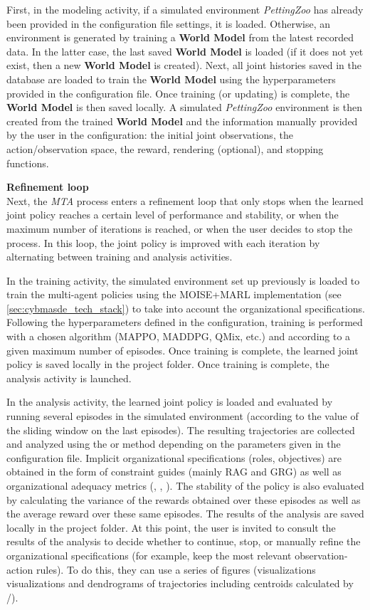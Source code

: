 First, in the modeling activity, if a simulated environment \textit{PettingZoo} has already been provided in the configuration file settings, it is loaded. Otherwise, an environment is generated by training a \textbf{World Model} from the latest recorded data. In the latter case, the last saved \textbf{World Model} is loaded (if it does not yet exist, then a new \textbf{World Model} is created). Next, all joint histories saved in the database are loaded to train the \textbf{World Model} using the hyperparameters provided in the configuration file. Once training (or updating) is complete, the \textbf {World Model} is then saved locally. A simulated \textit{PettingZoo} environment is then created from the trained \textbf{World Model} and the information manually provided by the user in the configuration: the initial joint observations, the action/observation space, the reward, rendering (optional), and stopping functions.

\noindent \textbf{Refinement loop} \\

Next, the \textit{MTA} process enters a refinement loop that only stops when the learned joint policy reaches a certain level of performance and stability, or when the maximum number of iterations is reached, or when the user decides to stop the process. In this loop, the joint policy is improved with each iteration by alternating between training and analysis activities.

In the training activity, the simulated environment set up previously is loaded to train the multi-agent policies using the MOISE+MARL implementation (see \autoref{sec:cybmasde_tech_stack}) to take into account the organizational specifications. Following the hyperparameters defined in the configuration, training is performed with a chosen algorithm (MAPPO, MADDPG, QMix, etc.) and according to a given maximum number of episodes. Once training is complete, the learned joint policy is saved locally in the project folder. Once training is complete, the analysis activity is launched.

In the analysis activity, the learned joint policy is loaded and evaluated by running several episodes in the simulated environment (according to the value of the sliding window on the last episodes). The resulting trajectories are collected and analyzed using the  or  method depending on the parameters given in the configuration file. Implicit organizational specifications (roles, objectives) are obtained in the form of constraint guides (mainly RAG and GRG) as well as organizational adequacy metrics (, , ). The stability of the policy is also evaluated by calculating the variance of the rewards obtained over these episodes as well as the average reward over these same episodes. The results of the analysis are saved locally in the project folder. At this point, the user is invited to consult the results of the analysis to decide whether to continue, stop, or manually refine the organizational specifications (for example, keep the most relevant observation-action rules). To do this, they can use a series of figures (visualizations  visualizations and dendrograms of trajectories including centroids calculated by /).

